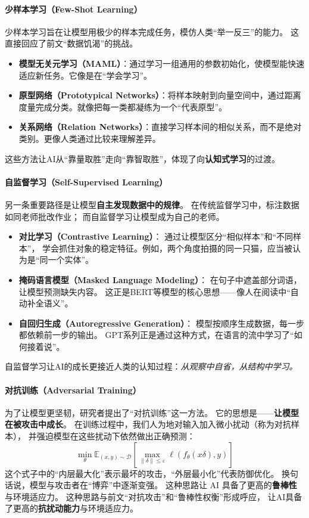 \paragraph{少样本学习（Few-Shot Learning）}  
少样本学习旨在让模型用极少的样本完成任务，模仿人类“举一反三”的能力。  这直接回应了前文“数据饥渴”的挑战。  

\begin{itemize}
\item \textbf{模型无关元学习（MAML）}：通过学习一组通用的参数初始化，使模型能快速适应新任务。它像是在“学会学习”。  
\item \textbf{原型网络（Prototypical Networks）}：将样本映射到向量空间中，通过距离度量完成分类。就像把每一类都凝练为一个“代表原型”。  
\item \textbf{关系网络（Relation Networks）}：直接学习样本间的相似关系，而不是绝对类别。更像人类通过比较来理解差异。  
\end{itemize}
这些方法让AI从“靠量取胜”走向“靠智取胜”，体现了向\textbf{认知式学习}的过渡。

\paragraph{自监督学习（Self-Supervised Learning）}  
另一条重要路径是让模型\textbf{自主发现数据中的规律}。  
在传统监督学习中，标注数据如同老师批改作业；  
而自监督学习让模型成为自己的老师。  

\begin{itemize}
\item \textbf{对比学习（Contrastive Learning）}：  
  通过让模型区分“相似样本”和“不同样本”，  
  学会抓住对象的稳定特征。例如，两个角度拍摄的同一只猫，应当被认为是“同一个实体”。  

\item \textbf{掩码语言模型（Masked Language Modeling）}：  
  在句子中遮盖部分词语，让模型预测缺失内容。  
  这正是BERT等模型的核心思想——像人在阅读中“自动补全语义”。  

\item \textbf{自回归生成（Autoregressive Generation）}：  
  模型按顺序生成数据，每一步都依赖前一步的输出。  
  GPT系列正是通过这种方式，在语言的流中学习了“如何接着说”。  
\end{itemize}
自监督学习让AI的成长更接近人类的认知过程：\textit{从观察中自省，从结构中学习。}

\paragraph{对抗训练（Adversarial Training）}  
为了让模型更坚韧，研究者提出了“对抗训练”这一方法。  
它的思想是——\textbf{让模型在被攻击中成长}。  
在训练过程中，我们人为地对输入加入微小扰动（称为对抗样本），  
并强迫模型在这些扰动下依然做出正确预测：  
$$\min_\theta \mathbb{E}_{(x,y) \sim \mathcal{D}} \left[ \max_{\|\delta\| \leq \varepsilon} \ell(f_\theta(x  \delta), y) \right]$$  
这个式子中的“内层最大化”表示最坏的攻击，“外层最小化”代表防御优化。  
换句话说，模型与攻击者在“博弈”中逐渐变强。  
这种思路让 AI 具备了更高的\textbf{鲁棒性}与环境适应力。
这种思路与前文“对抗攻击”和“鲁棒性权衡”形成呼应，  
让AI具备了更高的\textbf{抗扰动能力}与环境适应力。

